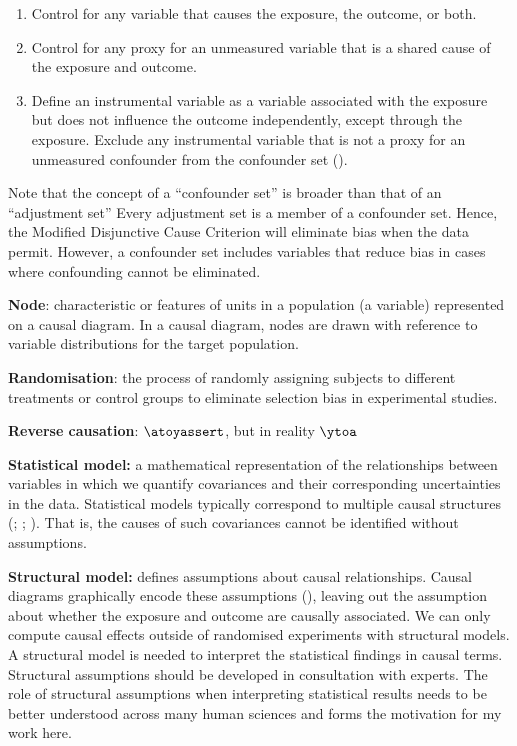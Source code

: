 \documentclass[
  singlecolumn]{article}
\providecommand{\tightlist}{%
  \setlength{\itemsep}{0pt}\setlength{\parskip}{0pt}}\usepackage{longtable,booktabs,array}
\begin{document}
\begin{enumerate}
\def\labelenumi{\alph{enumi}.}
\tightlist
\item
  Control for any variable that causes the exposure, the outcome, or
  both.
\item
  Control for any proxy for an unmeasured variable that is a shared
  cause of the exposure and outcome.
\item
  Define an instrumental variable as a variable associated with the
  exposure but does not influence the outcome independently, except
  through the exposure. Exclude any instrumental variable that is not a
  proxy for an unmeasured confounder from the confounder set
  ().
\end{enumerate}

Note that the concept of a ``confounder set'' is broader than that of an
``adjustment set'' Every adjustment set is a member of a confounder set.
Hence, the Modified Disjunctive Cause Criterion will eliminate bias when
the data permit. However, a confounder set includes variables that
reduce bias in cases where confounding cannot be eliminated.

\textbf{Node}: characteristic or features of units in a population (a
variable) represented on a causal diagram. In a causal diagram, nodes
are drawn with reference to variable distributions for the target
population.

\textbf{Randomisation}: the process of randomly assigning subjects to
different treatments or control groups to eliminate selection bias in
experimental studies.

\textbf{Reverse causation}: \(\atoyassert\), but in reality \(\ytoa\)

\textbf{Statistical model:} a mathematical representation of the
relationships between variables in which we quantify covariances and
their corresponding uncertainties in the data. Statistical models
typically correspond to multiple causal structures
(;
;
).
That is, the causes of such covariances cannot be identified without
assumptions.

\textbf{Structural model:} defines assumptions about causal
relationships. Causal diagrams graphically encode these assumptions
(), leaving out the
assumption about whether the exposure and outcome are causally
associated. We can only compute causal effects outside of randomised
experiments with structural models. A structural model is needed to
interpret the statistical findings in causal terms. Structural
assumptions should be developed in consultation with experts. The role
of structural assumptions when interpreting statistical results needs to
be better understood across many human sciences and forms the motivation
for my work here.
\end{document}
